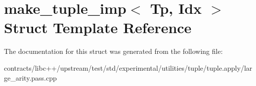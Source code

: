 \hypertarget{structmake__tuple__imp}{}\section{make\+\_\+tuple\+\_\+imp$<$ Tp, Idx $>$ Struct Template Reference}
\label{structmake__tuple__imp}


The documentation for this struct was generated from the following file\+:\begin{DoxyCompactItemize}
\item 
contracts/libc++/upstream/test/std/experimental/utilities/tuple/tuple.\+apply/large\+\_\+arity.\+pass.\+cpp\end{DoxyCompactItemize}
